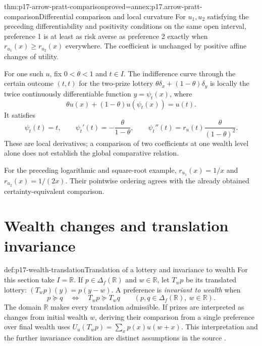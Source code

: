 \begin{hbtheorem}{thm:p17-arrow-pratt-comparison}{proved=annex:p17.arrow-pratt-comparison}{Differential comparison and local curvature}
For \(u_1,u_2\) satisfying the preceding differentiability and positivity
conditions on the same open interval, preference 1 is at least as risk
averse as preference 2 exactly when
\(r_{u_1}(x)\geq r_{u_2}(x)\) everywhere. The coefficient is unchanged
by positive affine changes of utility.

For one such \(u\), fix \(0<\theta<1\) and \(t\in I\). The
indifference curve through the certain outcome \((t,t)\) for the
two-prize lottery \(\theta\delta_x+(1-\theta)\delta_y\) is locally
the twice continuously differentiable function \(y=\psi_t(x)\), where
\[
 \theta u(x)+(1-\theta)u(\psi_t(x))=u(t).
\]
It satisfies
\[
 \psi_t(t)=t,\qquad
 \psi_t'(t)=-\frac{\theta}{1-\theta},\qquad
 \psi_t''(t)=r_u(t)\frac{\theta}{(1-\theta)^2}.
\]
These are local derivatives; a comparison of two coefficients at one
wealth level alone does not establish the global comparative relation.
\end{hbtheorem}

For the preceding logarithmic and square-root example,
\(r_{u_1}(x)=1/x\) and \(r_{u_2}(x)=1/(2x)\). Their pointwise
ordering agrees with the already obtained certainty-equivalent comparison.

\section{Wealth changes and translation invariance}
\label{sec:p17-wealth-invariance}

\begin{hbdefinition}{def:p17-wealth-translation}{Translation of a lottery and invariance to wealth}
For this section take \(I=\mathbb R\). If \(p\in\Delta_f(\mathbb R)\)
and \(w\in\mathbb R\), let \(T_wp\) be its translated lottery:
\((T_wp)(y)=p(y-w)\). A preference is \emph{invariant to wealth}
when
\[
            p\succeq q\quad\Longleftrightarrow\quad
                 T_wp\succeq T_wq
          \qquad(p,q\in\Delta_f(\mathbb R),\ w\in\mathbb R).
\]
The domain \(\mathbb R\) makes every translation admissible. If prizes
are interpreted as changes from initial wealth \(w\), deriving their
comparison from a single preference over final wealth uses
\(U_u(T_wp)=\sum_xp(x)u(w+x)\). This interpretation and the further
invariance condition are distinct assumptions in the source
\cite[pp.~115--117]{Rubinstein2015LectureNotes}.
\end{hbdefinition}

